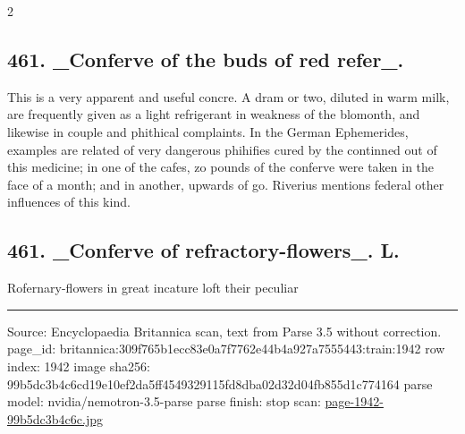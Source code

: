\documentclass[10pt]{article}
\begin{document}
\begin{multicols}{2}
\subsection*{461. \_Conferve of the buds of red refer\_.}
This is a very apparent and useful concre. A dram or two, diluted in warm milk, are frequently given as a light refrigerant in weakness of the blomonth, and likewise in couple and phithical complaints. In the German Ephemerides, examples are related of very dangerous phihifies cured by the continned out of this medicine; in one of the cafes, zo pounds of the conferve were taken in the face of a month; and in another, upwards of go. Riverius mentions federal other influences of this kind.

\subsection*{461. \_Conferve of refractory-flowers\_. L.}
Rofernary-flowers in great incature loft their peculiar

\end{multicols}
\vfill\par\noindent\rule{\linewidth}{0.4pt}\par
{\scriptsize\color{gray}\noindent Source: Encyclopaedia Britannica scan, text from Parse 3.5 without correction. page\_id: britannica:309f765b1ecc83e0a7f7762e44b4a927a7555443:train:1942 \quad row index: 1942 \quad image sha256: 99b5dc3b4c6cd19e10ef2da5ff4549329115fd8dba02d32d04fb855d1c774164 \quad parse model: nvidia/nemotron-3.5-parse \quad parse finish: stop \quad scan: \href{../scans/page-1942-99b5dc3b4c6c.jpg}{page-1942-99b5dc3b4c6c.jpg}\par}
\end{document}
